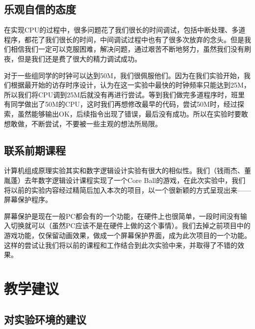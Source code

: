 \subsection{乐观自信的态度}

在实现CPU的过程中，很多问题花了我们很长的时间调试，包括中断处理、多道程序，都花了我们很长的时间，中间调试过程中也有了很多次放弃的念头。但是我们相信我们一定可以克服困难，解决问题，通过艰苦不断地努力，虽然我们没有刷夜，但是我们还是费了很大的精力调试成功。

对于一些组同学的时钟可以达到50M，我们很佩服他们。因为在我们实验开始，我们根据最开始的访存时序设计，认为在这一实验中最快的时钟频率只能达到25M，所以我们将CPU调到25M后就没有再进行尝试。等到我们做完多道程序时，班里有同学做出了50M的CPU，这时我们再想修改最早的代码，尝试50M时，经过探索，虽然能够输出OK，后续指令出现了错误，最后没有成功。所以在实验时要敢想敢做，不断尝试，不要被一些主观的想法所局限。


\subsection{联系前期课程}

计算机组成原理实验其实和数字逻辑设计实验有很大的相似性。我们（钱雨杰、董胤蓬）去年数字逻辑设计课程实现了一个Core Ball的游戏，在此次实验中，我们将以前的实验内容经过精简后加入本次的项目，以一个很新颖的方式呈现出来——屏幕保护程序。

屏幕保护是现在一般PC都会有的一个功能，在硬件上也很简单，一段时间没有输入切换就可以（虽然PC应该不是在硬件上做的这个事情）。我们去掉之前项目中的游戏功能，仅保留动画效果，做成一个屏幕保护界面，成为此次项目的一个功能。这样的尝试让我们将以前的课程和工作结合到此次实验中来，并取得了不错的效果。



\section{教学建议}


\subsection{对实验环境的建议}


